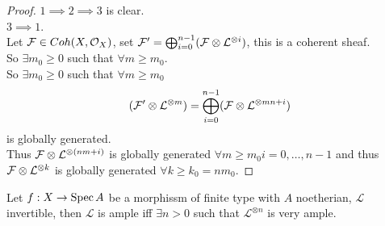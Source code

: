\documentclass[../main.tex]{subfiles}
\begin{document}
\begin{proof}
$1\implies 2 \implies 3$ is clear.\\
$3\implies 1$.\\
Let $\mathcal{F}\in Coh( X, \mathcal{O}_X) $, set $\mathcal{F}' = \bigoplus_{i=0}^{n-1} ( \mathcal{F} \otimes \mathcal{L}^{\otimes i}) $, this is a coherent sheaf.\\
So $\exists m_0 \geq 0$ such that $ \forall m \geq m_0$.\\
So $\exists m_0 \geq 0$ such that $\forall m \geq m_0$ 
\[ 
	( \mathcal{F}' \otimes \mathcal{L}^{\otimes m}) = \bigoplus_{i=0}^{n-1}( \mathcal{F} \otimes \mathcal{L}^{\otimes mn+i}) 
\]
is globally generated.\\
Thus $\mathcal{F} \otimes \mathcal{L}^{ \otimes ( nm+i) }$ is globally generated $\forall m \geq m_0 i=0,\ldots,n-1$ and thus $\mathcal{F} \otimes \mathcal{L}^{\otimes k}$ is globally generated $\forall k \geq k_0 = nm_0$.
\end{proof}
\begin{thm}
	Let $f:X\to \operatorname{Spec} A$ be a morphissm of finite type with $A$ noetherian, $ \mathcal{L}$ invertible, then $\mathcal{L}$ is ample iff $\exists n>0$ such that $ \mathcal{L}^{\otimes n}$ is very ample.
\end{thm}
\end{document}
